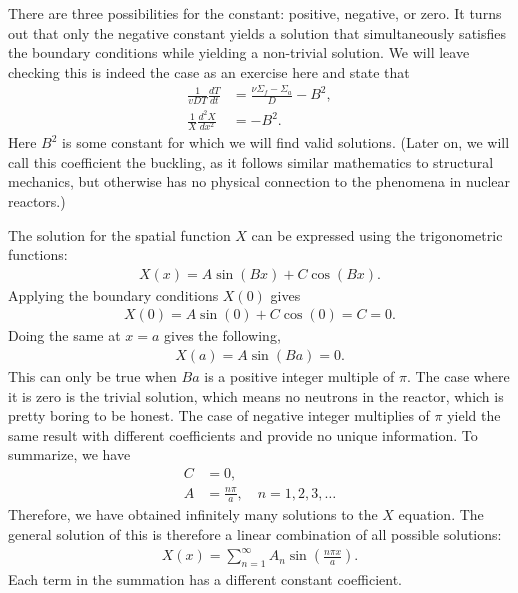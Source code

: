 There are three possibilities for the constant: positive, negative, or zero. It turns out that only the negative constant yields a solution that simultaneously satisfies the boundary conditions while yielding a non-trivial solution. We will leave checking this is indeed the case as an exercise here and state that
\begin{subequations}
\begin{align}
  \frac{1}{vD T} \frac{dT}{dt} &= \frac{ \nu \Sigma_f - \Sigma_a }{ D } - B^2, \\
  \frac{1}{X} \frac{d^2 X}{dx^2} &= -B^2 .
\end{align}
\end{subequations}
Here $B^2$ is some constant for which we will find valid solutions. (Later on, we will call this coefficient the buckling, as it follows similar mathematics to structural mechanics, but otherwise has no physical connection to the phenomena in nuclear reactors.)

The solution for the spatial function $X$ can be expressed using the trigonometric functions:
\begin{align}
  X(x) = A \sin ( Bx ) + C \cos ( Bx ) .
\end{align}
Applying the boundary conditions $X(0)$ gives
\begin{align}
  X(0) = A \sin( 0 ) + C \cos( 0 ) = C = 0. \nonumber
\end{align}
Doing the same at $x = a$ gives the following,
\begin{align}
  X(a) = A \sin( Ba ) = 0.
\end{align}
This can only be true when $Ba$ is a positive integer multiple of $\pi$. The case where it is zero is the trivial solution, which means no neutrons in the reactor, which is pretty boring to be honest. The case of negative integer multiplies of $\pi$ yield the same result with different coefficients and provide no unique information. To summarize, we have
\begin{subequations}
\begin{align}
  C &= 0, \\
  A &= \frac{n\pi}{a}, \quad n = 1, 2, 3, \ldots
\end{align}
\end{subequations}
Therefore, we have obtained infinitely many solutions to the $X$ equation. The general solution of this is therefore a linear combination of all possible solutions:
\begin{align}
  X(x) = \sum_{n=1}^\infty A_n \sin \left( \frac{ n \pi x }{ a } \right) .
\end{align}
Each term in the summation has a different constant coefficient.

